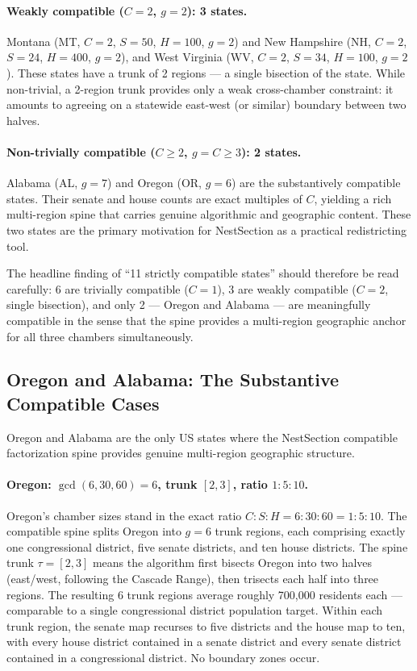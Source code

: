 \paragraph{Weakly compatible ($C = 2$, $g = 2$): 3 states.}
Montana (MT, $C=2$, $S=50$, $H=100$, $g=2$) and New Hampshire
(NH, $C=2$, $S=24$, $H=400$, $g=2$), and West Virginia
(WV, $C=2$, $S=34$, $H=100$, $g=2$).  These states have a trunk of 2 regions
--- a single bisection of the state.  While non-trivial, a 2-region trunk
provides only a weak cross-chamber constraint: it amounts to agreeing on
a statewide east-west (or similar) boundary between two halves.

\paragraph{Non-trivially compatible ($C \geq 2$, $g = C \geq 3$): 2 states.}
Alabama (AL, $g=7$) and Oregon (OR, $g=6$) are the substantively compatible
states.  Their senate and house counts are exact multiples of $C$, yielding
a rich multi-region spine that carries genuine algorithmic and geographic
content.  These two states are the primary motivation for NestSection as a
practical redistricting tool.

The headline finding of ``11 strictly compatible states'' should therefore be
read carefully: 6 are trivially compatible ($C=1$), 3 are weakly compatible
($C=2$, single bisection), and only 2 --- Oregon and Alabama --- are
meaningfully compatible in the sense that the spine provides a multi-region
geographic anchor for all three chambers simultaneously.

\subsection{Oregon and Alabama: The Substantive Compatible Cases}
\label{subsec:or-al}

Oregon and Alabama are the only US states where the NestSection compatible
factorization spine provides genuine multi-region geographic structure.

\paragraph{Oregon: $\gcd(6, 30, 60) = 6$, trunk $[2,3]$, ratio $1:5:10$.}
Oregon's chamber sizes stand in the exact ratio $C : S : H = 6 : 30 : 60 = 1 : 5 : 10$.
The compatible spine splits Oregon into $g = 6$ trunk regions, each comprising
exactly one congressional district, five senate districts, and ten house
districts.  The spine trunk $\tau = [2, 3]$ means the algorithm first bisects
Oregon into two halves (east/west, following the Cascade Range), then
trisects each half into three regions.  The resulting 6 trunk regions average
roughly 700,000 residents each --- comparable to a single congressional district
population target.  Within each trunk region, the senate map recurses to five
districts and the house map to ten, with every house district contained in a
senate district and every senate district contained in a congressional district.
No boundary zones occur.

